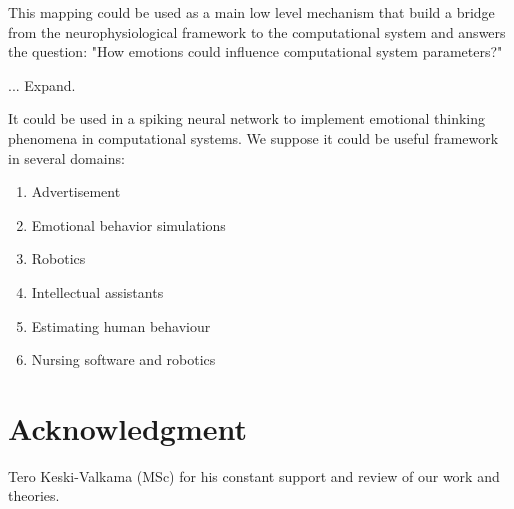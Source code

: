 This mapping could be used as a main low level mechanism that build a bridge from the neurophysiological framework to the computational system and answers the question: "How emotions could influence computational system parameters?"

... Expand.

It could be used in a spiking neural network to implement emotional thinking phenomena in computational systems. We suppose it could be useful framework in several domains:

\begin{enumerate}
 \item  Advertisement
 \item  Emotional behavior simulations
 \item  Robotics
 \item  Intellectual assistants
 \item  Estimating human behaviour
 \item  Nursing software and robotics
\end{enumerate}

\section{Acknowledgment}

Tero Keski-Valkama (MSc) for his constant support and review of our work and theories.
